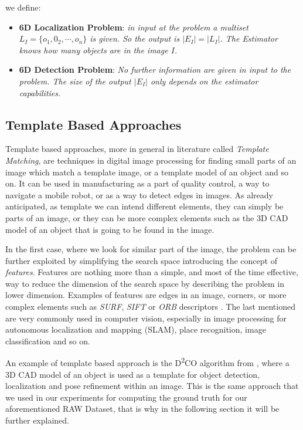 we define:

\begin{itemize}
	\item \textbf{6D Localization Problem}: \emph{in input at the problem a multiset $L_I = \{o_1, 0_2, \cdots, o_n\}$ is given. So the output is $|E_I| = |L_I|$. The Estimator knows how many objects are in the image $I$.}
	\item \textbf{6D Detection Problem}: \emph{No further information are given in input to the problem. The size of the output $|E_I|$ only depends on the estimator capabilities.}
\end{itemize}

\subsection{Template Based Approaches}\label{subsec:template_matching}
Template based approaches, more in general in literature called \emph{Template Matching}, are techniques in digital image processing for finding small parts of an image which match a template image, or a template model of an object and so on. It can be used in manufacturing as a part of quality control, a way to navigate a mobile robot, or as a way to detect edges in images. As already anticipated, as template we can intend different elements, they can simply be parts of an image, or they can be more complex elements such as the 3D CAD model of an object that is going to be found in the image. 

In the first case, where we look for similar part of the image, the problem can be further exploited by simplifying the search space introducing the concept of \emph{features}. Features are nothing more than a simple, and most of the time effective, way to reduce the dimension of the search space by describing the problem in lower dimension. Examples of features are edges in an image, corners, or more complex elements such as \emph{SURF}, \emph{SIFT} or \emph{ORB} descriptors \cite{karami2017image}. The last mentioned are very commonly used in computer vision, especially in image processing for autonomous localization and mapping (SLAM), place recognition, image classification and so on.

An example of template based approach is the D\textsuperscript{2}{CO} algorithm from \cite{imperoli2015d2co}, where a 3D CAD model of an object is used as a template for object detection, localization and pose refinement within an image. This is the same approach that we used in our experiments for computing the ground truth for our aforementioned RAW Dataset, that is why in the following section it will be further explained.

